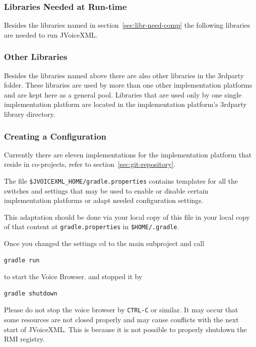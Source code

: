 \documentclass[11pt,a4paper]{article}
\begin{document}
\subsubsection{Libraries Needed at Run-time}

Besides the libraries named in section~\ref{sec:libr-need-comp} the following
libraries are needed to run JVoiceXML.

\subsubsection{Other Libraries}

Besides the libraries named above there are also other libraries in the
3rdparty folder. These libraries are used by more than one other implementation
platforms and are kept here as a general pool. Libraries that are used only by
one single implementation platform are located in the implementation platform's
3rdparty library directory.


\subsubsection{Creating a Configuration}
\label{sec:create-configuration}

Currently there are eleven implementations for the implementation platform
that reside in co-projects, refer to section~\ref{sec:git-repository}.

The file \texttt{\$JVOICEXML\_HOME/gradle.properties} contains templates for all
the switches and settings that may be used to enable or disable certain
implementation platforms or adapt needed configuration settings.

This adaptation should be done via your local copy of this file in your
local copy of that content at \texttt{gradle.properties} in
\texttt{\$HOME/.gradle}.

Once you changed the settings cd to the main subproject and call
\begin{lstlisting}
gradle run
\end{lstlisting}
to start the Voice Browser.
and stopped it by
\begin{lstlisting}
gradle shutdown
\end{lstlisting}

Please do not stop the voice browser by \texttt{CTRL-C} or similar. It may occur
that some resources are not closed properly and may cause conflicts with the next
start of JVoiceXML. This is because it is not possible to properly shutdown the
RMI registry.
\end{document}
